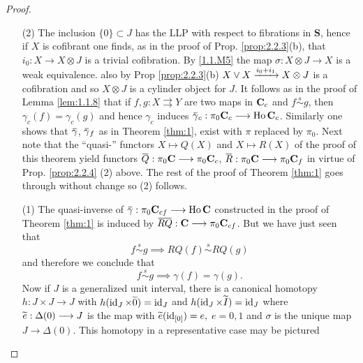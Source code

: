 \documentclass[../main]{subfiles}
\begin{document}
\begin{proof}
    \begin{enumerate}
        \item[(2)] The inclusion $\{0\}\subset J$ has the LLP with respect to fibrations in $\mathbf{S}$, hence if $X$ is cofibrant one finds, as in the proof of Prop. \ref{prop:2.2.3}(b), that $i_0:X\longrightarrow X\otimes J$ is a trivial cofibration. By \ref{1.1.M5} the map $\sigma:X\otimes J \longrightarrow X$ is a weak equivalence. also by Prop \ref{prop:2.2.3}(b) $X\vee X\varrightarrow{i_0+i_1}X\otimes J$ is a cofibration and so $X\otimes J$ is a cylinder object for $J$. It follows as in the proof of Lemma \ref{lem:1.1.8} that if $f,g:X\rightrightarrows Y$ are two maps in $\mathbf{C}_{c}$ and $f\overset{s}{\sim} g$, then $\gamma_c(f)= \gamma_c(g)$ and hence $\gamma_c$ induces $\xoverline{\gamma}_c:\pi_0 \C_c \longrightarrow \Ho \C_c$. Similarly one shows that $\xoverline{\gamma}$, $\xoverline{\gamma}_f$ as in Theorem \ref{thm:1}, exist with $\pi$ replaced by $\pi_0$. Next note that the ``quasi-'' functors $X\mapsto Q(X)$ and $X\mapsto R(X)$ of the proof of this theorem yield functors $\xoverline{Q}:\pi_0\C \longrightarrow\pi_0\C_c$, $\xoverline{R}:\pi_0\C\longrightarrow \pi_0 \C_f$ in virtue of Prop. \ref{prop:2.2.4} (2) above. The rest of the proof of Theorem \ref{thm:1} goes through without change so (2) follows.
        
        \item[(1)] The quasi-inverse of $\xoverline{\gamma}:\pi_0 \C_{cf} \longrightarrow \Ho\C$ constructed in the proof of Theorem \ref{thm:1} is induced by $\xoverline{RQ}:\C\longrightarrow \pi_0\C_{cf}$. But we have just seen that 
        \[f\overset{s}{\sim}g\implies RQ(f)\overset{s}{\sim}RQ(g)\]
        and therefore we conclude that 
        \[f\overset{s}{\sim}g\implies \gamma(f)=\gamma(g).\]
        Now if $J$ is a generalized unit interval, there is a canonical homotopy \\$h:J\times J\longrightarrow J$ with $h(\id_J\times \xtilde{0}) = \id_J$ and $h(\id_J\times \xtilde{I}) = \id_J$ where \\$\xtilde{e}:\Delta(0)\longrightarrow J$ is the map with $\xtilde{e}(\id_{[0]}) = e,$ $e=0,1$ and $\sigma$ is the unique map $J\longrightarrow \Delta(0)$. This homotopy in a representative case may be pictured
        \begin{figure}[ht]
           \centering
           \label{fig:diagram}
        \end{figure}


\end{enumerate}
\end{proof}
\end{document}
